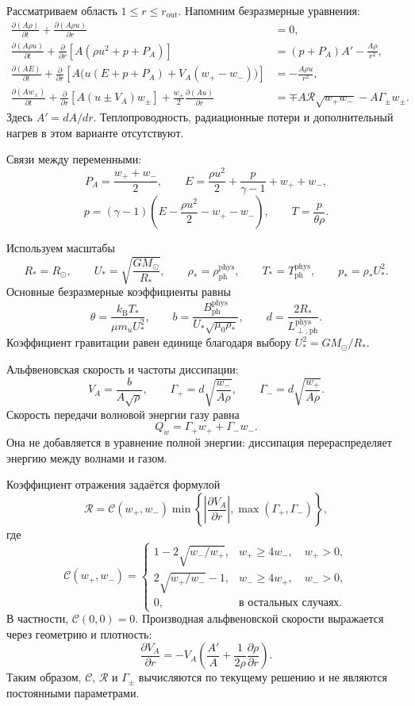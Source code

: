 \documentclass[11pt,a4paper]{article}
\begin{document}
Рассматриваем область $1\le r\le r_{\mathrm{out}}$.
Напомним безразмерные уравнения:
\[
\begin{aligned}
\frac{\partial(A\rho)}{\partial t}
+\frac{\partial(A\rho u)}{\partial r}
&=0,\\[4pt]
\frac{\partial(A\rho u)}{\partial t}
+\frac{\partial}{\partial r}
\left[A(\rho u^2+p+P_A)\right]
&=(p+P_A)A'-\frac{A\rho}{r^2},\\[4pt]
\frac{\partial(AE)}{\partial t}
+\frac{\partial}{\partial r}
\left[A\bigl(u(E+p+P_A)+V_A(w_+-w_-)\bigr)\right]
&=-\frac{A\rho u}{r^2},\\[4pt]
\frac{\partial(Aw_\pm)}{\partial t}
+\frac{\partial}{\partial r}
\left[A(u\pm V_A)w_\pm\right]
+\frac{w_\pm}{2}\frac{\partial(Au)}{\partial r}
&=\mp A\mathcal R\sqrt{w_+w_-}
-A\Gamma_\pm w_\pm.
\end{aligned}
\]
Здесь $A'=dA/dr$. Теплопроводность, радиационные потери
и дополнительный нагрев в этом варианте отсутствуют.

Связи между переменными:
\[
P_A=\frac{w_++w_-}{2},
\qquad
E=\frac{\rho u^2}{2}+\frac{p}{\gamma-1}+w_++w_-,
\]
\[
p=(\gamma-1)
\left(E-\frac{\rho u^2}{2}-w_+-w_-\right),
\qquad
T=\frac{p}{\theta\rho}.
\]

Используем масштабы
\[
R_*=R_\odot,\qquad
U_*=\sqrt{\frac{GM_\odot}{R_*}},\qquad
\rho_*=\rho_{\mathrm{ph}}^{\mathrm{phys}},\qquad
T_*=T_{\mathrm{ph}}^{\mathrm{phys}},\qquad
p_*=\rho_*U_*^2.
\]
Основные безразмерные коэффициенты равны
\[
\theta=\frac{k_{\mathrm B}T_*}{\mu m_uU_*^2},
\qquad
b=\frac{B_{\mathrm{ph}}^{\mathrm{phys}}}
{U_*\sqrt{\mu_0\rho_*}},
\qquad
d=\frac{2R_*}{L_{\perp,\mathrm{ph}}^{\mathrm{phys}}}.
\]
Коэффициент гравитации равен единице
благодаря выбору $U_*^2=GM_\odot/R_*$.

Альфвеновская скорость и частоты диссипации:
\[
V_A=\frac{b}{A\sqrt{\rho}},
\qquad
\Gamma_+=d\sqrt{\frac{w_-}{A\rho}},
\qquad
\Gamma_-=d\sqrt{\frac{w_+}{A\rho}}.
\]
Скорость передачи волновой энергии газу равна
\[
Q_w=\Gamma_+w_++\Gamma_-w_-.
\]
Она не добавляется в уравнение полной энергии:
диссипация перераспределяет энергию между волнами и газом.

Коэффициент отражения задаётся формулой
\[
\mathcal R
=
\mathcal C(w_+,w_-)
\min\!\left\{
\left|\frac{\partial V_A}{\partial r}\right|,
\max(\Gamma_+,\Gamma_-)
\right\},
\]
где
\[
\mathcal C(w_+,w_-)=
\begin{cases}
1-2\sqrt{w_-/w_+},
& w_+\ge4w_-,\quad w_+>0,\\[4pt]
2\sqrt{w_+/w_-}-1,
& w_-\ge4w_+,\quad w_->0,\\[4pt]
0,
& \text{в остальных случаях}.
\end{cases}
\]
В частности, $\mathcal C(0,0)=0$.
Производная альфвеновской скорости выражается через
геометрию и плотность:
\[
\frac{\partial V_A}{\partial r}
=
-V_A\left(
\frac{A'}{A}
+\frac{1}{2\rho}\frac{\partial\rho}{\partial r}
\right).
\]
Таким образом, $\mathcal C$, $\mathcal R$ и $\Gamma_\pm$
вычисляются по текущему решению и не являются
постоянными параметрами.
\end{document}
